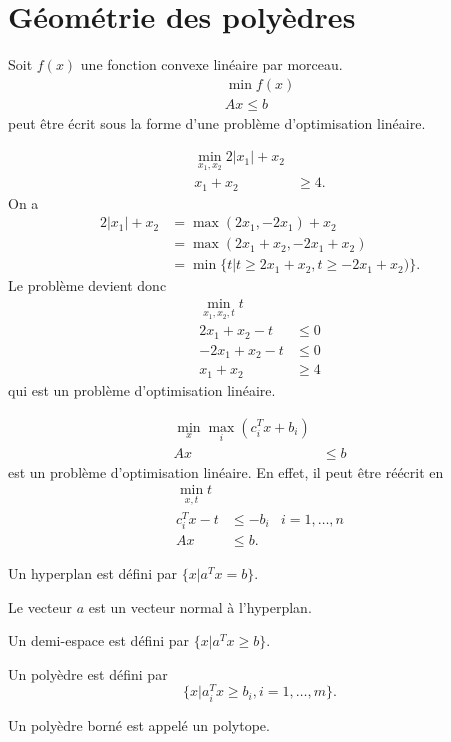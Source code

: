 \section{Géométrie des polyèdres}
\begin{myprop}
  Soit $f(x)$ une fonction convexe linéaire par morceau.
  \begin{align*}
    \min f(x)\\
    Ax \leq b
  \end{align*}
  peut être écrit sous la forme d'une problème d'optimisation linéaire.
\end{myprop}
\begin{myexem}
  \begin{align*}
    \min_{x_1,x_2} 2|x_1| + x_2\\
    x_1 + x_2 & \geq 4.
  \end{align*}
  On a
  \begin{align*}
    2|x_1|+x_2 & = \max(2x_1,-2x_1) + x_2\\
    & = \max(2x_1+x_2,-2x_1+x_2)\\
    & = \min\{t|t\geq 2x_1+x_2,t\geq -2x_1+x_2)\}.
  \end{align*}
  Le problème devient donc
  \begin{align*}
    \min_{x_1, x_2, t} t\\
    2x_1 + x_2 - t & \leq 0\\
    -2x_1 + x_2 - t & \leq 0\\
    x_1 + x_2 & \geq 4
  \end{align*}
  qui est un problème d'optimisation linéaire.
\end{myexem}
\begin{myexem}
  \begin{align*}
    \min_{x} \max_i (c_i^Tx+b_i)\\
    Ax & \leq b
  \end{align*}
  est un problème d'optimisation linéaire.
  En effet, il peut être réécrit en
  \begin{align*}
    \min_{x,t} t\\
    c_i^Tx-t & \leq -b_i & i = 1, \ldots, n\\
    Ax & \leq b.
  \end{align*}
\end{myexem}

\begin{mydef}[Hyperplan]
  Un hyperplan est défini par
  $\{ x|a^Tx=b \}$.
\end{mydef}
Le vecteur $a$ est un vecteur normal à l'hyperplan.
\begin{mydef}
  Un demi-espace est défini par
  $\{x|a^Tx\geq b\}$.
\end{mydef}
\begin{mydef}[Polyèdre]
  Un polyèdre est défini par
  \[ \{x|a_i^Tx \geq b_i, i = 1,\ldots,m\}. \]
\end{mydef}
Un polyèdre borné est appelé un polytope.


